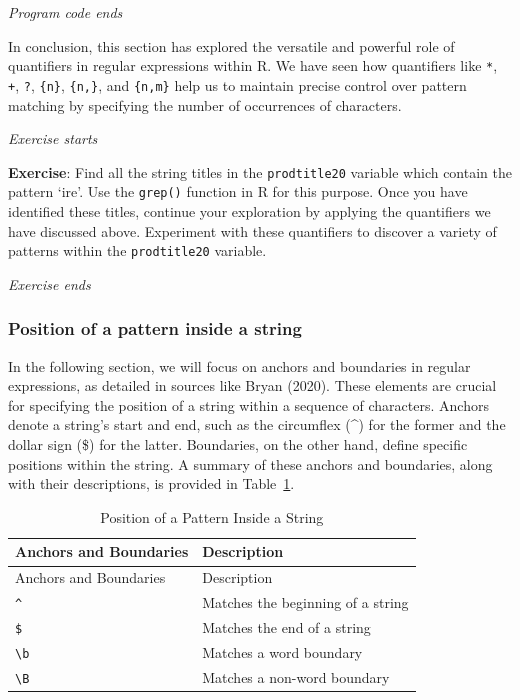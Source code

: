 \emph{Program code ends}

In conclusion, this section has explored the versatile and powerful role
of quantifiers in regular expressions within R. We have seen how
quantifiers like \texttt{*}, \texttt{+}, \texttt{?}, \texttt{\{n\}},
\texttt{\{n,\}}, and \texttt{\{n,m\}} help us to maintain precise control over
pattern matching by specifying the number of occurrences of characters.

\emph{Exercise starts}

\textbf{Exercise}: Find all the string titles in the \texttt{prodtitle20}
variable which contain the pattern `ire'. Use the \texttt{grep()}
function in R for this purpose. Once you have identified these titles,
continue your exploration by applying the quantifiers we have discussed
above. Experiment with these quantifiers to discover a variety of
patterns within the \texttt{prodtitle20} variable.

\emph{Exercise ends}

\subsubsection{Position of a pattern inside a
string}\label{position-of-pattern-inside-a-string}

In the following section, we will focus on anchors and boundaries in
regular expressions, as detailed in sources like Bryan (2020). These
elements are crucial for specifying the position of a string within a
sequence of characters. Anchors denote a string's start and end, such as the circumflex (\^{}) for the former and the
dollar sign (\$) for the latter.
Boundaries, on the other hand, define specific positions within the
string. A summary of these anchors and boundaries, along with their
descriptions, is provided in Table~\ref{tbl-position1}.

\begin{longtable}[]{@{}ll@{}}
\caption{Position of a Pattern Inside a
String}\label{tbl-position1}\tabularnewline
\toprule\noalign{}
Anchors and Boundaries & Description \\
\midrule\noalign{}
\endfirsthead
\toprule\noalign{}
Anchors and Boundaries & Description \\
\midrule\noalign{}
\endhead
\bottomrule\noalign{}
\endlastfoot
\texttt{\^{}} & Matches the beginning of a string \\
\texttt{\$} & Matches the end of a string \\
\texttt{\textbackslash{}b} & Matches a word boundary \\
\texttt{\textbackslash{}B} & Matches a non-word boundary \\
\end{longtable}

